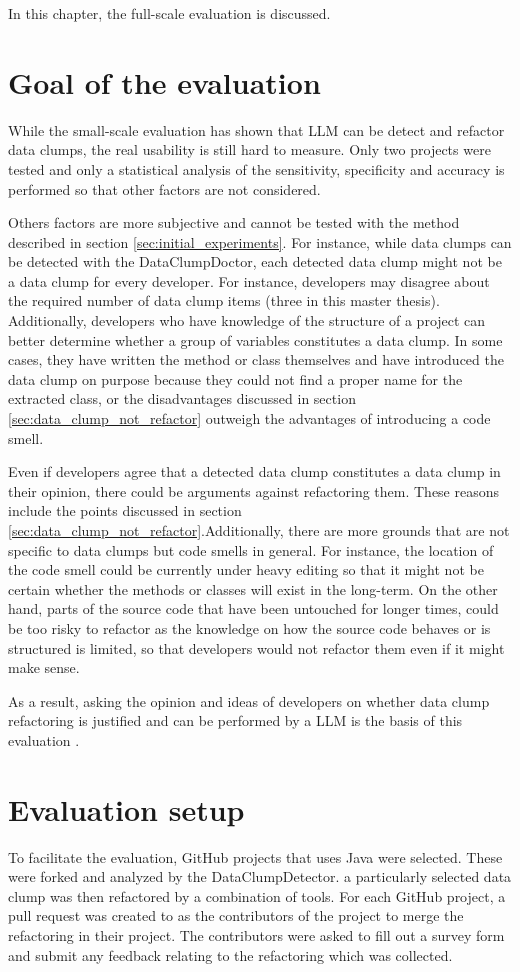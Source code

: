 
In this chapter, the full-scale evaluation is discussed.
\section{Goal of the evaluation}
While the small-scale evaluation has shown that \acs{LLM} can be detect and refactor data clumps, the real usability is still hard to measure. Only two projects were tested and only a statistical analysis of the sensitivity, specificity and accuracy  is performed so that other factors are not considered.

Others factors are more subjective and cannot be tested with the method described in section \ref{sec:initial_experiments}. For instance, while data clumps can be detected with the DataClumpDoctor, each detected data clump might not be a data clump for every developer. For instance, developers may disagree about the required number of data clump items (three in this master thesis). Additionally, developers who have knowledge of the structure of a project can better determine whether a group of variables  constitutes a data clump. In some cases, they have written the method or class themselves and have introduced the data clump on purpose because they could not find a proper name for the extracted class, or the disadvantages discussed in section \ref{sec:data_clump_not_refactor} outweigh the advantages of introducing a code smell. 

Even if developers agree that a detected data clump constitutes a data clump  in their opinion, there could be arguments against refactoring them. These reasons include the points  discussed in section \ref{sec:data_clump_not_refactor}.Additionally, there are more grounds that are not specific to data clumps but code smells in general. For instance, the location of the code smell could be currently under heavy editing so that it might not be certain whether the methods or classes will exist in the long-term. On the other hand, parts of the source code that have been untouched for longer times, could be too risky to refactor as the knowledge on how the source code behaves or is structured is limited, so that developers would not refactor them even if it might make sense. 

As a result, asking the opinion and ideas of developers on whether data clump refactoring is justified and can be performed by a \ac{LLM} is the basis of this evaluation .
\section{Evaluation setup}
To facilitate the evaluation, GitHub projects that uses Java  were selected. These were forked and analyzed by the DataClumpDetector. a particularly selected data clump was then refactored by a combination of tools. For each GitHub project, a pull request was created to as the contributors  of the project to merge the refactoring in their project. The contributors were asked to fill out a survey form and submit any feedback relating to the refactoring which was collected. 

